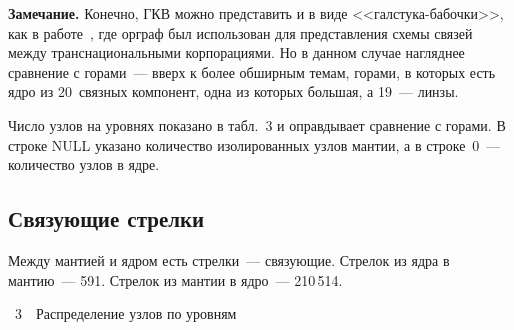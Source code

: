 \begin{multicols}{2}
   \medskip
   
   \noindent
   \textbf{Замечание.} Конечно, ГКВ можно представить и в виде 
   <<гал\-сту\-ка-ба\-боч\-ки>>, как в работе~\cite{7-shk}, где орграф был использован для 
представления схемы связей между транснациональными корпорациями. Но в данном случае 
нагляднее сравнение с горами~--- вверх к более обширным темам, горами, в которых есть 
ядро из 20~связных компонент, одна из которых большая, а 19~--- линзы.
   
   Число узлов на уровнях показано в табл.~3 и оправдывает сравнение с горами.
   В  строке NULL указано количество изолированных узлов мантии, 
а в строке~0~--- количество узлов в ядре.

\subsection*{Связующие стрелки}

   Между мантией и ядром есть стрелки~--- связу\-ющие. Стрелок из ядра в мантию~--- 591. 
Стрелок из мантии в ядро~--- 210\,514.
   
     \begin{center}  %
\parbox{120pt}{{\tablename~3}\ \ \small{Распределение узлов по уровням}}

\vspace*{6pt}


\end{center}
\end{multicols}
